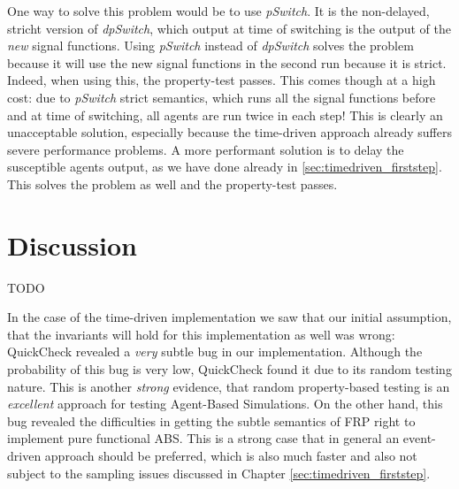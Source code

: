 One way to solve this problem would be to use \textit{pSwitch}. It is the non-delayed, stricht version of \textit{dpSwitch}, which output at time of switching is the output of the \textit{new} signal functions. Using \textit{pSwitch} instead of \textit{dpSwitch} solves the problem because it will use the new signal functions in the second run because it is strict. Indeed, when using this, the property-test passes. This comes though at a high cost: due to \textit{pSwitch} strict semantics, which runs all the signal functions before and at time of switching, all agents are run twice in each step! This is clearly an unacceptable solution, especially because the time-driven approach already suffers severe performance problems. A more performant solution is to delay the susceptible agents output, as we have done already in \ref{sec:timedriven_firststep}. This solves the problem as well and the property-test passes. 

\section{Discussion}
TODO

In the case of the time-driven implementation we saw that our initial assumption, that the invariants will hold for this implementation as well was wrong: QuickCheck revealed a \textit{very} subtle bug in our implementation. Although the probability of this bug is very low, QuickCheck found it due to its random testing nature. This is another \textit{strong} evidence, that random property-based testing is an \textit{excellent} approach for testing Agent-Based Simulations. On the other hand, this bug revealed the difficulties in getting the subtle semantics of FRP right to implement pure functional ABS. This is a strong case that in general an event-driven approach should be preferred, which is also much faster and also not subject to the sampling issues discussed in Chapter \ref{sec:timedriven_firststep}.